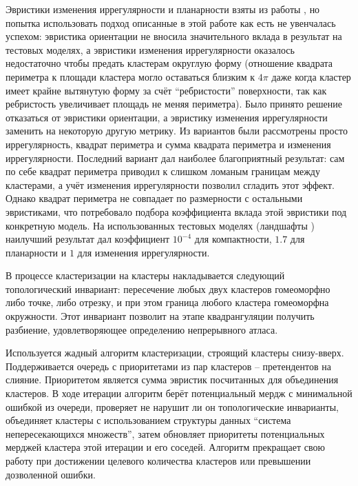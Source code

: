 \documentclass[12pt]{extarticle}
\begin{document}
Эвристики изменения иррегулярности и планарности взяты из работы \cite{garland2001}, но попытка использовать подход описанные в этой работе как есть не увенчалась успехом: эвристика ориентации не вносила значительного вклада в результат на тестовых моделях, а эвристики изменения иррегулярности оказалось недостаточно чтобы предать кластерам округлую форму (отношение квадрата периметра к площади кластера могло оставаться близким к $4\pi$ даже когда кластер имеет крайне вытянутую форму за счёт ``ребристости'' поверхности, так как ребристость увеличивает площадь не меняя периметра). Было принято решение отказаться от эвристики ориентации, а эвристику изменения иррегулярности заменить на некоторую другую метрику. Из вариантов были рассмотрены просто иррегулярность, квадрат периметра и сумма квадрата периметра и изменения иррегулярности. Последний вариант дал наиболее благоприятный результат: сам по себе квадрат периметра приводил к слишком ломаным границам между кластерами, а учёт изменения иррегулярности позволил сгладить этот эффект. Однако квадрат периметра не совпадает по размерности с остальными эвристиками, что потребовало подбора коэффициента вклада этой эвристики под конкретную модель. На использованных тестовых моделях (ландшафты \cite{quixel_megascans}) наилучший результат дал коэффициент $10^{-4}$ для компактности, $1.7$ для планарности и $1$ для изменения иррегулярности.

В процессе кластеризации на кластеры накладывается следующий топологический инвариант: пересечение любых двух кластеров гомеоморфно либо точке, либо отрезку, и при этом граница любого кластера гомеоморфна окружности. Этот инвариант позволит на этапе квадрангуляции получить разбиение, удовлетворяющее определению непрерывного атласа.

Используется жадный алгоритм кластеризации, строящий кластеры снизу-вверх. Поддерживается очередь с приоритетами из пар кластеров -- претендентов на слияние. Приоритетом является сумма эвристик посчитанных для объединения кластеров. В ходе итерации алгоритм берёт потенциальный мердж с минимальной ошибкой из очереди, проверяет не нарушит ли он топологические инварианты, объединяет кластеры с использованием структуры данных ``система непересекающихся множеств'', затем обновляет приоритеты потенциальных мерджей кластера этой итерации и его соседей. Алгоритм прекращает свою работу при достижении целевого количества кластеров или превышении дозволенной ошибки.
\end{document}

